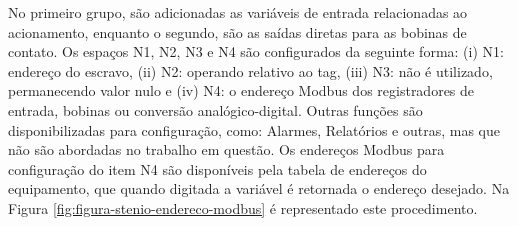         \begin{figure}[!h]
    	\end{figure}
    	
No primeiro grupo, são adicionadas as variáveis de entrada relacionadas ao acionamento, enquanto o segundo, são as saídas diretas para as bobinas de contato. Os espaços N1, N2, N3 e N4 são configurados da seguinte forma: (i) N1: endereço do escravo, (ii) N2: operando relativo ao tag, (iii) N3: não é utilizado, permanecendo valor nulo e (iv) N4: o endereço Modbus dos registradores de entrada, bobinas ou conversão analógico-digital.
\newpage
Outras funções são disponibilizadas para configuração, como: Alarmes, Relatórios e outras, mas que não são abordadas no trabalho em questão. Os endereços Modbus para configuração do item N4 são disponíveis pela tabela de endereços do equipamento, que quando digitada a variável é retornada o endereço desejado. Na Figura \ref{fig:figura-stenio-endereco-modbus} é representado este procedimento.
    	
        \begin{figure}[!h]
    	\end{figure}

